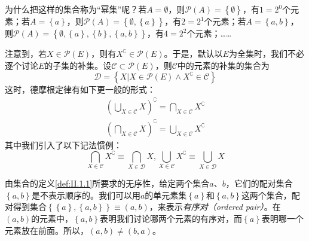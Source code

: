 \documentclass[../main.tex]{subfiles}
\begin{document}
为什么把这样的集合称为“幂集”呢？若$A=\emptyset$，则$\mathcal{P}\left(A\right)=\left\{\emptyset\right\}$，有$1=2^0$个元素；若$A=\left\{a\right\}$，则$\mathcal{P}\left(A\right)=\left\{\emptyset,\left\{a\right\}\right\}$，有$2=2^1$个元素；若$A=\left\{a,b\right\}$，则$\mathcal{P}\left(A\right)=\left\{\emptyset,\left\{a\right\},\left\{b\right\},\left\{a,b\right\}\right\}$，有$4=2^2$个元素；……

注意到，若$X\in\mathcal{P}\left(E\right)$，则有$X^\complement\in\mathcal{P}\left(E\right)$。于是，默认以$E$为全集时，我们不必逐个讨论$E$的子集的补集。设$\mathcal{C}\subset\mathcal{P}\left(E\right)$，则$\mathcal{C}$中的元素的补集的集合为
\[
    \mathcal{D}=\left\{X|X\in\mathcal{P}\left(E\right)\wedge X^\complement\in\mathcal{C}\right\}
\]
这时，德摩根定律有如下更一般的形式：
\begin{align*}
    \left(\bigcup_{X\in\mathcal{C}}X\right)^\complement=\bigcap_{X\in\mathcal{C}}X^\complement \\
    \left(\bigcap_{X\in\mathcal{C}}X\right)^\complement=\bigcup_{X\in\mathcal{C}}X^\complement
\end{align*}
其中我们引入了以下记法惯例：
\[
    \bigcap_{X\in\mathcal{C}}X^\complement\equiv\bigcap_{X\in\mathcal{D}}X, \bigcup_{X\in\mathcal{C}}X^\complement\equiv\bigcup_{X\in\mathcal{D}}X
\]

由集合的定义\ref{def:II.1.1}所要求的无序性，给定两个集合$a$、$b$，它们的配对集合$\left\{a,b\right\}$是不表示顺序的。我们可以用$a$的单元素集$\left\{a\right\}$和$\left\{a,b\right\}$这两个集合，配对得到集合$\left\{\left\{a\right\},\left\{a,b\right\}\right\}\equiv\left(a,b\right)$，来表示\emph{有序对（ordered pair）}。在$\left(a,b\right)$的元素中，$\left\{a,b\right\}$表明我们讨论哪两个元素的有序对，而$\left\{a\right\}$表明哪一个元素放在前面。所以，$\left(a,b\right)\neq\left(b,a\right)$。
\end{document}
